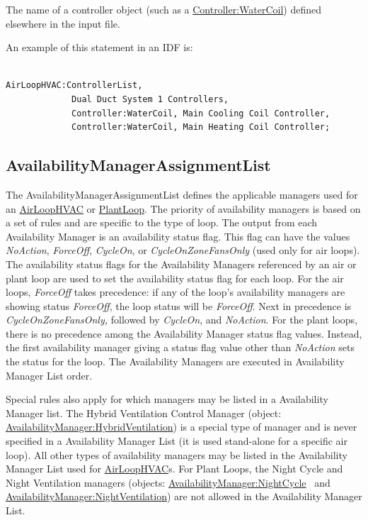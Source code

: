 The name of a controller object (such as a \hyperref[controllerwatercoil]{Controller:WaterCoil}) defined elsewhere in the input file.

An example of this statement in an IDF is:

\begin{lstlisting}

AirLoopHVAC:ControllerList,
             Dual Duct System 1 Controllers,
             Controller:WaterCoil, Main Cooling Coil Controller,
             Controller:WaterCoil, Main Heating Coil Controller;
\end{lstlisting}

\subsection{AvailabilityManagerAssignmentList}\label{availabilitymanagerassignmentlist}

The AvailabilityManagerAssignmentList defines the applicable managers used for an \hyperref[airloophvac]{AirLoopHVAC} or \hyperref[plantloop]{PlantLoop}. The priority of availability managers is based on a set of rules and are specific to the type of loop. The output from each Availability Manager is an availability status flag. This flag can have the values \emph{NoAction}, \emph{ForceOff}, \emph{CycleOn}, or \emph{CycleOnZoneFansOnly} (used only for air loops). The availability status flags for the Availability Managers referenced by an air or plant loop are used to set the availability status flag for each loop. For the air loops, \emph{ForceOff} takes precedence: if any of the loop's availability managers are showing status \emph{ForceOff}, the loop status will be \emph{ForceOff}. Next in precedence is \emph{CycleOnZoneFansOnly,} followed by \emph{CycleOn}, and \emph{NoAction}. For the plant loops, there is no precedence among the Availability Manager status flag values. Instead, the first availability manager giving a status flag value other than \emph{NoAction} sets the status for the loop. The Availability Managers are executed in Availability Manager List order.

Special rules also apply for which managers may be listed in a Availability Manager list. The Hybrid Ventilation Control Manager (object: \hyperref[availabilitymanagerhybridventilation]{AvailabilityManager:HybridVentilation}) is a special type of manager and is never specified in a Availability Manager List (it is used stand-alone for a specific air loop). All other types of availability managers may be listed in the Availability Manager List used for \hyperref[airloophvac]{AirLoopHVAC}s. For Plant Loops, the Night Cycle and Night Ventilation managers (objects: \hyperref[availabilitymanagernightcycle]{AvailabilityManager:NightCycle} ~and \hyperref[availabilitymanagernightventilation]{AvailabilityManager:NightVentilation}) are not allowed in the Availability Manager List.

